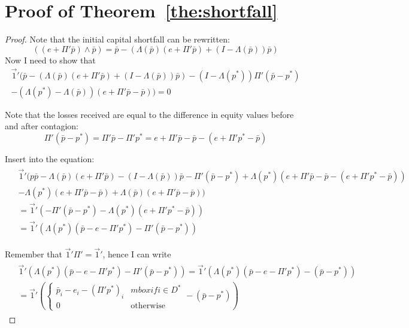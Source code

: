 \documentclass[12pt,a4paper]{article}
\begin{document}
\section{Proof of Theorem~\ref{the:shortfall}}
\begin{proof}

Note that the initial capital shortfall can be rewritten: 
\[
((e+\Pi' \bar{p})\wedge \bar{p}) = \bar{p}-(\Lambda(\bar{p})(e+\Pi' \bar{p})+(I-\Lambda(\bar{p} )) \bar{p})
\]
Now I need to show that
\begin{multline*}
\vec{1}' (\bar{p}-(\Lambda(\bar{p})(e+\Pi' \bar{p})+(I-\Lambda(\bar{p})) \bar{p})-(I-\Lambda(p^* )) \Pi' (\bar{p}-p^* ) \\
-(\Lambda(p^* )-\Lambda(\bar{p}))(e+\Pi' \bar{p}-\bar{p}))=0
\end{multline*}

Note that the losses received are equal to the difference in equity values before and after contagion: 
\[
\Pi' (\bar{p}-p^* )=\Pi' \bar{p}-\Pi' p^*=e+\Pi' \bar{p}-\bar{p}-(e+\Pi' p^*-\bar{p})
\]

Insert into the equation:
\begin{align*}
\begin{split}
& \vec{1}'(p\bar{p}-\Lambda(\bar{p})(e+\Pi' \bar{p})-(I-\Lambda(\bar{p})) \bar{p}-\Pi' (\bar{p}-p^* )+\Lambda(p^* )(e+\Pi' \bar{p}-\bar{p}-(e+\Pi' p^*-\bar{p})) \\
& -\Lambda(p^* )(e+\Pi' \bar{p}-\bar{p})+\Lambda(\bar{p})(e+\Pi' \bar{p}-\bar{p})) \\
& =\vec{1}'(-\Pi' (\bar{p}-p^* )-\Lambda(p^* )(e+\Pi' p^*-\bar{p})) \\
& =\vec{1}'(\Lambda(p^* )(\bar{p}-e-\Pi' p^* )-\Pi' (\bar{p}-p^* ))
\end{split}
\end{align*}

Remember that $\vec{1}' \Pi'= \vec{1}'$, hence I can write
\begin{align*}
\begin{split}
& \vec{1}' (\Lambda(p^* )(\bar{p}-e-\Pi' p^* )-\Pi' (\bar{p}-p^* ))=\vec{1}' (\Lambda(p^* )(\bar{p}-e-\Pi' p^* )-(\bar{p}-p^* )) \\
& =\vec{1}' (
\begin{cases}
\bar{p}_i-e_i-(\Pi' p^* )_i  &mbox{if } i \in D^* \\
0 &\mbox{otherwise}
\end{cases}
-(\bar{p}-p^* ))
\end{split}
\end{align*}


\end{proof}
\end{document}
